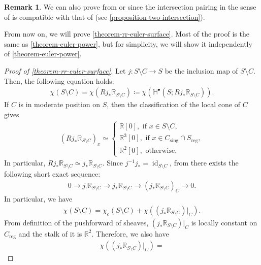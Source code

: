 \documentclass[a4paper,dvipdfmx,reqno,12pt]{amsart}
\theoremstyle{definition}
\newtheorem{remark}[theorem]{Remark}
\newcommand{\deq}{\coloneqq}
\newcommand{\opn}[1]{\operatorname{#1}}
\numberwithin{equation}{section}
\begin{document}
\begin{remark}
We can also prove from \cite[Theorem 4.2]{MR3032930}
or \cite[Theorem 4.11]{shaw2015tropical}
since the intersection pairing in the sense of
\cite{MR4637248} is compatible with that of
\cite{shaw2015tropical,demedrano2023chern}
(see \cref{proposition-two-intersection}). 
\end{remark}

From now on, we will prove \cref{theorem-rr-euler-surface}.
Most of the proof is the same as \cref{theorem-euler-power},
but for simplicity,
we will show it independently of \cref{theorem-euler-power}.

\begin{proof}[{Proof of \cref{theorem-rr-euler-surface}}]
Let $j\colon S\setminus C\to S$ be the inclusion map
of $S\setminus C$.
Then, the following equation holds:
\begin{align}
\chi(S\setminus C)=\chi(Rj_*\mathbb{R}_{S\setminus C})
\deq \chi(\mathbb{H}^{\bullet}(S;Rj_*\mathbb{R}_{S\setminus C})).
\end{align}
If $C$ is in moderate position on $S$, then
the classification of the local cone of $C$ gives 
\begin{align}
(Rj_*\mathbb{R}_{S\setminus C})_x
\simeq
\begin{cases}
\mathbb{R}[0], \text{ if } x\in S\setminus C, \\
\mathbb{R}^3[0], \text{ if } x\in C_{\mathrm{sing}}
\cap S_{\mathrm{reg}}, \\
\mathbb{R}^2[0], \text{ otherwise.}  
\end{cases}  
\end{align}
In particular, $Rj_*\mathbb{R}_{S\setminus C}\simeq
j_*\mathbb{R}_{S\setminus C}$.
Since $j^{-1}j_*=\opn{id}_{S\setminus C}$,  
from \cite[Proposition 2.3.6 (v)]{MR1299726}
there exists the following short exact sequence:
\begin{align}
0\to j_!\mathbb{R}_{S\setminus C} 
\to j_* \mathbb{R}_{S\setminus C}
\to (j_*\mathbb{R}_{S\setminus C})_{C} \to 0.
\end{align}
In particular, we have
\begin{align}
\chi(S\setminus C)=
\chi_c(S\setminus C)+\chi((j_*\mathbb{R}_{S\setminus C})|_C).
\end{align}
From definition of the pushforward of sheaves, 
$(j_*\mathbb{R}_{S\setminus C})|_C$ is locally constant 
on $C_{\opn{reg}}$ and the stalk of it is $\mathbb{R}^2$.
Therefore, we also have
\begin{align}
\chi((j_*\mathbb{R}_{S\setminus C})|_C)=

\end{align}
\end{proof}
\end{document}
